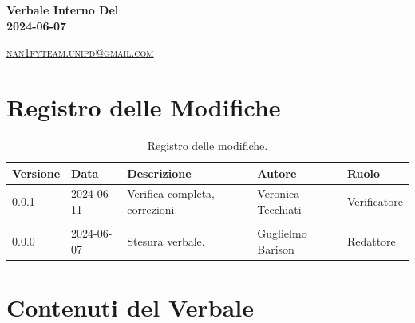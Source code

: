 \documentclass[8pt]{article}
\begin{document}
\begin{titlepage}
\begin{minipage}[t]{0.47\textwidth}
{		}
		\vspace{4mm}\vspace{4mm}
	\end{minipage}
	\vspace{4cm}
	\begin{center}
		\begin{flushright}
			{\fontsize{30pt}{52pt}\selectfont \textbf{Verbale Interno Del\\2024-06-07\\}} %
		\end{flushright}
		\vspace{3cm}
	\end{center}
	\vspace{8.5 cm}
	{\small \textsc{\href{mailto: nan1fyteam.unipd@gmail.com}{nan1fyteam.unipd@gmail.com}}}
\end{titlepage}
\pagestyle{mystyle}
\section*{Registro delle Modifiche}
\begin{table}[ht!]	
	\centering
	\begin{tabular}{p{1.2cm} p{2cm} p{6cm} p{3cm} p{2cm}}
		\toprule
		\textbf{Versione}& \textbf{Data} & \textbf{Descrizione} & \textbf{Autore} & \textbf{Ruolo} \\
		\midrule
            0.0.1 & 2024-06-11 & Verifica completa, correzioni. & Veronica Tecchiati & Verificatore \\\\
		0.0.0 & 2024-06-07 & Stesura verbale. & Guglielmo Barison & Redattore
 \\ %

		\bottomrule
	\end{tabular}
	\caption{Registro delle modifiche.}
	\label{table:Registro delle modifiche}
\end{table}
\newpage
\tableofcontents
\clearpage
\newpage
\justifying
\section{Contenuti del Verbale}
\end{document}
